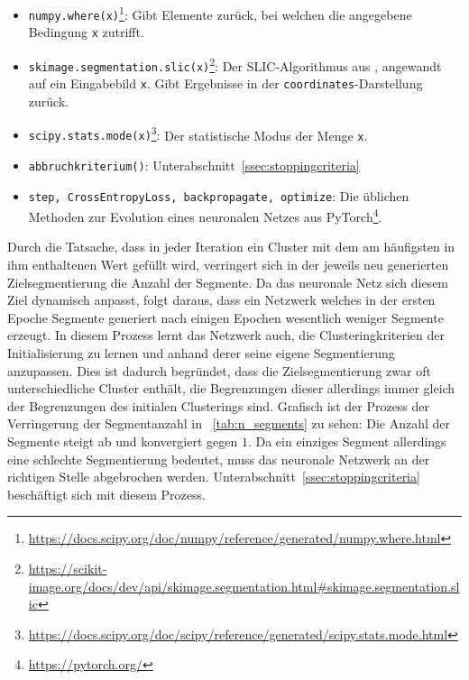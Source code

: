 \begin{itemize}
	\item{\lstinline[columns=fixed]{numpy.where(x)}\footnote{\url{https://docs.scipy.org/doc/numpy/reference/generated/numpy.where.html}}:} Gibt Elemente zurück, bei welchen die angegebene Bedingung \lstinline[columns=fixed]{x} zutrifft.
	\item{\lstinline[columns=fixed]{skimage.segmentation.slic(x)}\footnote{\url{https://scikit-image.org/docs/dev/api/skimage.segmentation.html\#skimage.segmentation.slic}}:} Der SLIC-Algorithmus aus \cite{achanta_10}, angewandt auf ein Eingabebild \lstinline[columns=fixed]{x}. Gibt Ergebnisse in der \lstinline[columns=fixed]{coordinates}-Darstellung zurück.
	\item{\lstinline[columns=fixed]{scipy.stats.mode(x)}\footnote{\url{https://docs.scipy.org/doc/scipy/reference/generated/scipy.stats.mode.html}}:} Der statistische Modus der Menge \lstinline[columns=fixed]{x}.
	\item{\lstinline[columns=fixed]{abbruchkriterium()}:} \Vgl Unterabschnitt~\ref{ssec:stoppingcriteria}
	\item{\lstinline[columns=fixed]{step, CrossEntropyLoss, backpropagate, optimize}:} Die üblichen Methoden zur Evolution eines neuronalen Netzes aus PyTorch\footnote{\url{https://pytorch.org/}}.
\end{itemize}

Durch die Tatsache, dass in jeder Iteration ein Cluster mit dem am häufigsten in ihm enthaltenen Wert gefüllt wird, verringert sich in der jeweils neu generierten Zielsegmentierung die Anzahl der Segmente. Da das neuronale Netz sich diesem Ziel dynamisch anpasst, folgt daraus, dass ein Netzwerk welches in der ersten Epoche  Segmente generiert nach einigen Epochen wesentlich weniger Segmente erzeugt. In diesem Prozess lernt das Netzwerk auch, die Clusteringkriterien der Initialisierung zu lernen und anhand derer seine eigene Segmentierung anzupassen. Dies ist dadurch begründet, dass die Zielsegmentierung zwar oft unterschiedliche Cluster enthält, die Begrenzungen dieser allerdings immer gleich der Begrenzungen des initialen Clusterings sind.
Grafisch ist der Prozess der Verringerung der Segmentanzahl in \tablename~\ref{tab:n_segments} zu sehen: Die Anzahl der Segmente steigt ab und konvergiert gegen $1$. Da ein einziges Segment allerdings eine schlechte Segmentierung bedeutet, muss das neuronale Netzwerk an der richtigen Stelle abgebrochen werden. Unterabschnitt~\ref{ssec:stoppingcriteria} beschäftigt sich mit diesem Prozess.


